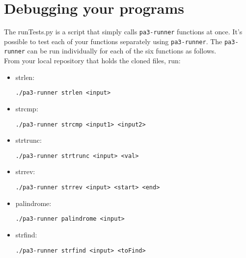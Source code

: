 \documentclass{article}
\begin{document}
\section{Debugging your programs}
The runTests.py is a script that simply calls \texttt{pa3-runner} functions at once. It's possible to test each of your functions separately using \texttt{pa3-runner}. The \texttt{pa3-runner} can be run individually for each of the six functions as follows.\\
From your local repository that holds the cloned files, run:

\begin{itemize}
\item strlen:
\begin{verbatim}
./pa3-runner strlen <input>
\end{verbatim}
\item strcmp:
\begin{verbatim}
./pa3-runner strcmp <input1> <input2>
\end{verbatim}
\item strtrunc:
\begin{verbatim}
./pa3-runner strtrunc <input> <val>
\end{verbatim}
\item strrev:
\begin{verbatim}
./pa3-runner strrev <input> <start> <end>
\end{verbatim}
\item palindrome:
\begin{verbatim}
./pa3-runner palindrome <input>
\end{verbatim}
\item strfind:
\begin{verbatim}
./pa3-runner strfind <input> <toFind>
\end{verbatim}
\end{itemize}
\end{document}
